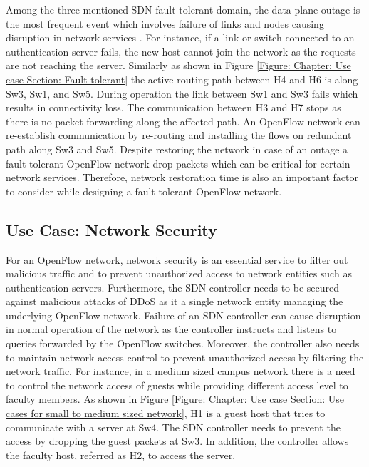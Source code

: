 Among the three mentioned SDN fault tolerant domain, the data plane outage is the most frequent event which involves failure of links and nodes causing disruption in network services \cite{Maciej:2012:Automatic}. For instance, if a link or switch connected to an authentication server fails, the new host cannot join the network as the requests are not reaching the server. Similarly as shown in Figure \ref{Figure: Chapter: Use case Section: Fault tolerant} the active routing path between H4 and H6 is along Sw3, Sw1, and Sw5. During operation the link between Sw1 and Sw3 fails which results in connectivity loss. The communication between H3 and H7 stops as there is no packet forwarding along the affected path. An OpenFlow network can re-establish communication by re-routing and installing the flows on redundant path along Sw3 and Sw5. Despite restoring the network in case of an outage a fault tolerant OpenFlow network drop packets which can be critical for certain network services. Therefore, network restoration time is also an important factor to consider while designing a fault tolerant OpenFlow network.

\subsection{Use Case: Network Security}
\label{Chapter:Use Case and Requirements section:Access control}

For an OpenFlow network, network security is an essential service to filter out malicious traffic and to prevent unauthorized access to network entities such as authentication servers. Furthermore, the SDN controller needs to be secured against malicious attacks of DDoS as it a single network entity managing the underlying OpenFlow network. Failure of an SDN controller can cause disruption in normal operation of the network as the controller instructs and listens to queries forwarded by the OpenFlow switches. Moreover, the controller also needs to maintain network access control to prevent unauthorized access by filtering the network traffic. For instance, in a medium sized campus network there is a need to control the network access of guests while providing different access level to faculty members. As shown in Figure \ref{Figure: Chapter: Use case Section: Use cases for small to medium sized network}, H1 is a guest host that tries to communicate with a server at Sw4. The SDN controller needs to prevent the access by dropping the guest packets at Sw3. In addition, the controller allows the faculty host, referred as H2, to access the server.


